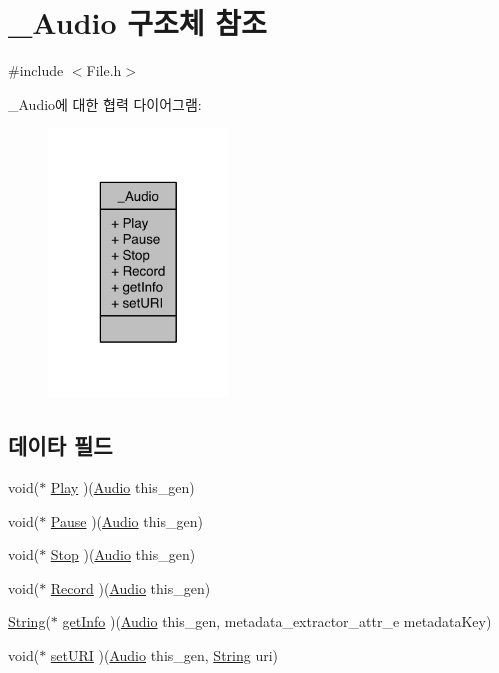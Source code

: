 \hypertarget{struct___audio}{\section{\-\_\-\-Audio 구조체 참조}
\label{struct___audio}
}


{\ttfamily \#include $<$File.\-h$>$}



\-\_\-\-Audio에 대한 협력 다이어그램\-:\nopagebreak
\begin{figure}[H]
\begin{center}
\leavevmode
\includegraphics[width=136pt]{db/d5b/struct___audio__coll__graph}
\end{center}
\end{figure}
\subsection*{데이타 필드}
\begin{DoxyCompactItemize}
\item 
void($\ast$ \hyperlink{struct___audio_a406855bb5ad50dfefae012be99b06cde}{Play} )(\hyperlink{_file_8h_a37d3938964971e2cb1ed957c60f7a5b9}{Audio} this\-\_\-gen)
\item 
void($\ast$ \hyperlink{struct___audio_a3d78751cda929e033894cbd9f552ae8e}{Pause} )(\hyperlink{_file_8h_a37d3938964971e2cb1ed957c60f7a5b9}{Audio} this\-\_\-gen)
\item 
void($\ast$ \hyperlink{struct___audio_a04a848082fe555df88ae9bc35f4223d3}{Stop} )(\hyperlink{_file_8h_a37d3938964971e2cb1ed957c60f7a5b9}{Audio} this\-\_\-gen)
\item 
void($\ast$ \hyperlink{struct___audio_abcf52f46187e6c2e2fbc5bd8512adad1}{Record} )(\hyperlink{_file_8h_a37d3938964971e2cb1ed957c60f7a5b9}{Audio} this\-\_\-gen)
\item 
\hyperlink{dit_8h_a2efe6d463d80744789f228f5dc4baa39}{String}($\ast$ \hyperlink{struct___audio_af557af230def744c4b3ed69d5b3c2076}{get\-Info} )(\hyperlink{_file_8h_a37d3938964971e2cb1ed957c60f7a5b9}{Audio} this\-\_\-gen, metadata\-\_\-extractor\-\_\-attr\-\_\-e metadata\-Key)
\item 
void($\ast$ \hyperlink{struct___audio_a1c40fa54cdb34775aeb35430f5901990}{set\-U\-R\-I} )(\hyperlink{_file_8h_a37d3938964971e2cb1ed957c60f7a5b9}{Audio} this\-\_\-gen, \hyperlink{dit_8h_a2efe6d463d80744789f228f5dc4baa39}{String} uri)
\end{DoxyCompactItemize}


